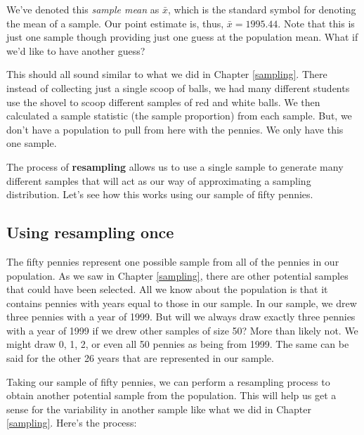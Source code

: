 \documentclass[12pt, krantz2,]{krantz}
\begin{document}
We've denoted this \emph{sample mean} as \(\bar{x}\), which is the standard symbol for denoting the mean of a sample. Our point estimate is, thus, \(\bar{x} = 1995.44\). Note that this is just one sample though providing just one guess at the population mean. What if we'd like to have another guess?

This should all sound similar to what we did in Chapter \ref{sampling}. There instead of collecting just a single scoop of balls, we had many different students use the shovel to scoop different samples of red and white balls. We then calculated a sample statistic (the sample proportion) from each sample. But, we don't have a population to pull from here with the pennies. We only have this one sample.

The process of \textbf{resampling} allows us to use a single sample to generate many different samples that will act as our way of approximating a sampling distribution. Let's see how this works using our sample of fifty pennies.

\hypertarget{using-resampling-once}{%
\subsection{Using resampling once}\label{using-resampling-once}}

The fifty pennies represent one possible sample from all of the pennies in our population. As we saw in Chapter \ref{sampling}, there are other potential samples that could have been selected. All we know about the population is that it contains pennies with years equal to those in our sample. In our sample, we drew three pennies with a year of 1999. But will we always draw exactly three pennies with a year of 1999 if we drew other samples of size 50? More than likely not. We might draw 0, 1, 2, or even all 50 pennies as being from 1999. The same can be said for the other 26 years that are represented in our sample.

Taking our sample of fifty pennies, we can perform a resampling process to obtain another potential sample from the population. This will help us get a sense for the variability in another sample like what we did in Chapter \ref{sampling}. Here's the process:
\end{document}
